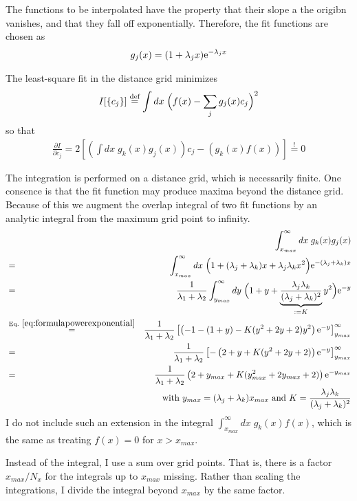 \documentclass[11pt,a4paper]{report}
\begin{document}
The functions to be interpolated have the property that their slope a
the origibn vanishes, and that they fall off exponentially. Therefore,
the fit functions are chosen as
\begin{eqnarray}
g_j(x)=(1+\lambda_j x)\mathrm{e}^{-\lambda_j x}
\end{eqnarray}


The least-square fit in the distance grid minimizes
\begin{eqnarray}
I[\{c_j\}]\stackrel{\text{def}}{=} \int dx\;\Bigl(f(x)-\sum_j g_j(x) c_j\Bigr)^2
\end{eqnarray}
so that
\begin{eqnarray}
\frac{\partial I}{\partial c_j}= 2
\left[\left(\int dx\; g_k(x)g_j(x)\right) c_j
-\left(g_k(x) f(x)\right)\right]\stackrel{!}{=}0
\end{eqnarray}

The integration is performed on a distance grid, which is necessarily
finite. One consence is that the fit function may produce maxima
beyond the distance grid. Because of this we augment the overlap
integral of two fit functions by an analytic integral from the maximum
grid point to infinity.
\begin{eqnarray}
&&\int_{x_{max}}^\infty dx\; g_k(x)g_j(x)
\nonumber\\
&=&
\int_{x_{max}}^\infty dx\; 
\Bigl(1+(\lambda_j+\lambda_k)x+\lambda_j\lambda_kx^2\Bigr)
\e{-(\lambda_j+\lambda_k)x}
\nonumber\\
&=&
\frac{1}{\lambda_1+\lambda_2}
\int_{y_{max}}^\infty dy\; 
\Bigl(1+y+
\underbrace{\frac{\lambda_j\lambda_k}{(\lambda_j+\lambda_k)^2}}_{:=K}y^2\Bigr)
\e{-y}
\nonumber\\
&\eqrel{eq:formulapowerexponential}{=}&
\frac{1}{\lambda_1+\lambda_2}
\left[\left(-1-(1+y)-K(y^2+2y+2)y^2\right)\e{-y}\right]_{y_{max}}^\infty
\nonumber\\
&=&
\frac{1}{\lambda_1+\lambda_2}
\left[-\left(2+y+K(y^2+2y+2)\right)\e{-y}\right]_{y_{max}}^\infty
\nonumber\\
&=&
\frac{1}{\lambda_1+\lambda_2}
\left(2+y_{max}+K(y_{max}^2+2y_{max}+2)\right)\e{-y_{max}}
\nonumber\\
&&\qquad
\text{with $y_{max}=(\lambda_j+\lambda_k)x_{max}$ and
$K=\frac{\lambda_j\lambda_k}{(\lambda_j+\lambda_k)^2}$}
\end{eqnarray}
I do not include such an extension in the integral
$\int_{x_{max}}^\infty dx\;g_k(x)f(x)$, which is the same as treating
$f(x)=0$ for $x>x_{max}$.

Instead of the integral, I use a sum over grid points. That is, there
is a factor $x_{max}/N_x$ for the integrals up to $x_{max}$
missing. Rather than scaling the integrations, I divide the integral
beyond $x_{max}$ by the same factor.
\end{document}
